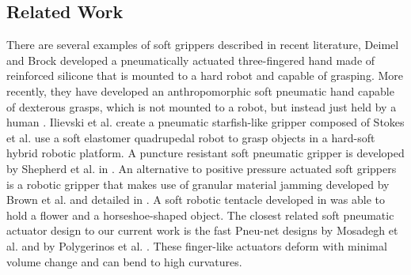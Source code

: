 \subsection{Related Work}
There are several examples of soft grippers described in recent literature,  
Deimel and Brock \cite{deimel2013compliant} developed a pneumatically actuated three-fingered hand made of reinforced silicone that is mounted to a hard robot and capable of grasping.
More recently, they have developed an anthropomorphic soft pneumatic hand capable of dexterous grasps, which is not mounted to a robot, but instead just held by a human \cite{deimel2014novel}. 
Ilievski et al. \cite{ilievski2011soft} create  a pneumatic starfish-like gripper composed of  
Stokes et al. \cite{Stokes2014hybrid} use a soft elastomer quadrupedal robot to grasp objects in a hard-soft hybrid robotic platform. 
A puncture resistant soft pneumatic gripper is developed by Shepherd et al. in \cite{shepherd2013soft}. 
An alternative to positive pressure actuated soft grippers is a robotic gripper that makes use of granular material jamming developed by Brown et al. and detailed in \cite{brown2010universal}.
A soft robotic tentacle developed in \cite{martinez2013robotic} was able to hold a flower and a horseshoe-shaped object.
The closest related soft pneumatic actuator design to our current work is the fast Pneu-net designs by Mosadegh et al. \cite{mosadegh2014pneumatic} and by Polygerinos et al. \cite{polygerinos2013towards}.
These finger-like actuators deform with minimal volume change and can bend to high curvatures.


